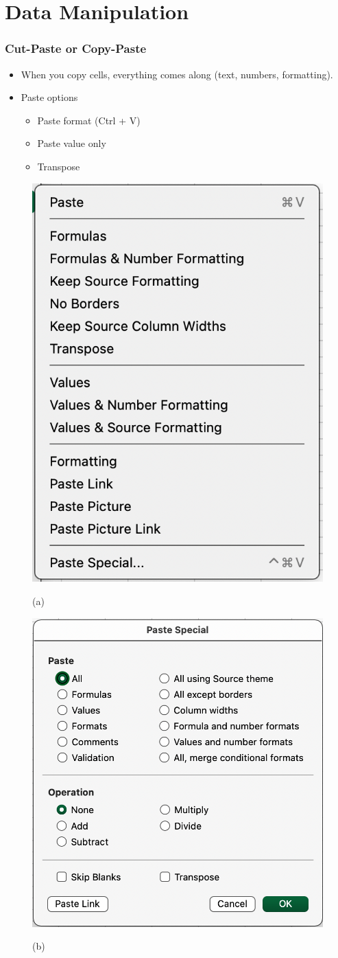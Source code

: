 \documentclass[12pt]{beamer}
\begin{document}
\section{Data Manipulation}

	\begin{frame}
		\frametitle{Cut-Paste or Copy-Paste}
		\begin{itemize}
			\item When you copy cells, everything comes along (text, numbers, formatting).
			\item Paste options
				\begin{itemize}
				\item Paste format (Ctrl + V) \item Paste value only
				\item Transpose
				\end{itemize}
		\end{itemize}
	\begin{figure}[htb]
		\begin{minipage}[t]{0.49\linewidth}\centering
			\includegraphics[width=0.49\linewidth]{pasteoptions.png}
			\medskip
			\centerline{(a)}
		\end{minipage}\hfill
		\begin{minipage}[t]{0.5\linewidth}\centering
			\includegraphics[width=0.5\linewidth]{pasteoptions_full.png}
			\medskip
			\centerline{(b)}
		\end{minipage}
	\end{figure}
	\end{frame}
\end{document}
